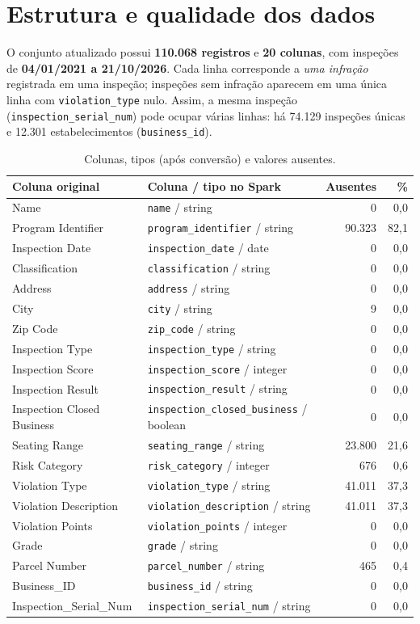 \documentclass[11pt,a4paper]{article}
\newcommand{\col}[1]{\texttt{#1}}
\begin{document}
\section{Estrutura e qualidade dos dados}

O conjunto atualizado possui \textbf{110.068 registros} e \textbf{20 colunas}, com inspeções de \textbf{04/01/2021 a 21/10/2026}. Cada linha corresponde a \emph{uma infração} registrada em uma inspeção; inspeções sem infração aparecem em uma única linha com \col{violation\_type} nulo. Assim, a mesma inspeção (\col{inspection\_serial\_num}) pode ocupar várias linhas: há 74.129 inspeções únicas e 12.301 estabelecimentos (\col{business\_id}).

\begin{table}[H]
\centering
\small
\caption{Colunas, tipos (após conversão) e valores ausentes.}
\begin{tabular}{llrr}
\toprule
Coluna original & Coluna / tipo no Spark & Ausentes & \% \\
\midrule
Name & \col{name} / string & 0 & 0,0 \\
Program Identifier & \col{program\_identifier} / string & 90.323 & 82,1 \\
Inspection Date & \col{inspection\_date} / date & 0 & 0,0 \\
Classification & \col{classification} / string & 0 & 0,0 \\
Address & \col{address} / string & 0 & 0,0 \\
City & \col{city} / string & 9 & 0,0 \\
Zip Code & \col{zip\_code} / string & 0 & 0,0 \\
Inspection Type & \col{inspection\_type} / string & 0 & 0,0 \\
Inspection Score & \col{inspection\_score} / integer & 0 & 0,0 \\
Inspection Result & \col{inspection\_result} / string & 0 & 0,0 \\
Inspection Closed Business & \col{inspection\_closed\_business} / boolean & 0 & 0,0 \\
Seating Range & \col{seating\_range} / string & 23.800 & 21,6 \\
Risk Category & \col{risk\_category} / integer & 676 & 0,6 \\
Violation Type & \col{violation\_type} / string & 41.011 & 37,3 \\
Violation Description & \col{violation\_description} / string & 41.011 & 37,3 \\
Violation Points & \col{violation\_points} / integer & 0 & 0,0 \\
Grade & \col{grade} / string & 0 & 0,0 \\
Parcel Number & \col{parcel\_number} / string & 465 & 0,4 \\
Business\_ID & \col{business\_id} / string & 0 & 0,0 \\
Inspection\_Serial\_Num & \col{inspection\_serial\_num} / string & 0 & 0,0 \\
\bottomrule
\end{tabular}
\end{table}
\end{document}
